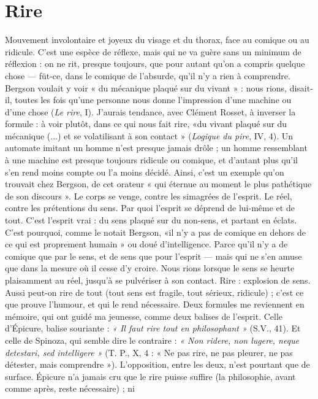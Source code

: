 \section{Rire}
Mouvement involontaire et joyeux du visage et du thorax, face au
comique ou au ridicule. C’est une espèce de réflexe, mais qui ne va
guère sans un minimum de réflexion : on ne rit, presque toujours, que pour
autant qu’on a compris quelque chose — füt-ce, dans le comique de l'absurde,
qu'il n’y a rien à comprendre. Bergson voulait y voir « du mécanique plaqué sur
du vivant » : nous rions, disait-il, toutes les fois qu’une personne nous donne
l'impression d’une machine ou d’une chose ({\it Le rire}, I). J'aurais tendance, avec
Clément Rosset, à inverser la formule : à voir plutôt, dans ce qui nous fait rire,
«du vivant plaqué sur du mécanique (...) et se volatilisant à son contact »
({\it Logique du pire}, IV, 4). Un automate imitant un homme n’est presque jamais
drôle ; un homme ressemblant à une machine est presque toujours ridicule ou
comique, et d'autant plus qu’il s’en rend moins compte ou l’a moins décidé.
Ainsi, c'est un exemple qu’on trouvait chez Bergson, de cet orateur « qui
éternue au moment le plus pathétique de son discours ». Le corps se venge,
contre les simagrées de l'esprit. Le réel, contre les prétentions du sens. Par quoi
l'esprit se déprend de lui-même et de tout. C’est l'esprit vrai : du sens plaqué
sur du non-sens, et partant en éclats. C’est pourquoi, comme le notait Bergson,
«il n’y a pas de comique en dehors de ce qui est proprement humain » ou doué
d'intelligence. Parce qu’il n’y a de comique que par le sens, et de sens que pour
l'esprit — mais qui ne s’en amuse que dans la mesure où il cesse d’y croire. Nous
rions lorsque le sens se heurte plaisamment au réel, jusqu’à se pulvériser à son
contact. Rire : explosion de sens. Aussi peut-on rire de tout (tout sens est fragile,
tout sérieux, ridicule) ; c’est ce que prouve l'humour, et qui le rend nécessaire.
Deux formules me reviennent en mémoire, qui ont guidé ma jeunesse,
comme deux balises de l'esprit. Celle d’Épicure, balise souriante : {\it « Il faut rire
tout en philosophant »} (S.V., 41). Et celle de Spinoza, qui semble dire le
contraire : {\it « Non ridere, non lugere, neque detestari, sed intelligere »} (T. P., X, 4 :
« Ne pas rire, ne pas pleurer, ne pas détester, mais comprendre »). L’opposition,
entre les deux, n’est pourtant que de surface. Épicure n’a jamais cru que
le rire puisse suffire (la philosophie, avant comme après, reste nécessaire) ; ni

